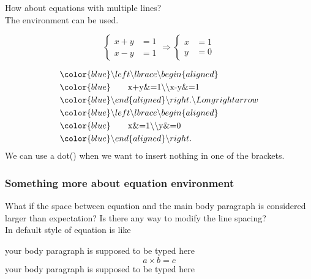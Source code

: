 \documentclass{beamer}
\begin{document}
\begin{frame}
	How about equations with multiple lines?\\
	The  environment can be used.
	\begin{example}
		\begin{equation}
		\left\lbrace\begin{aligned}
			x+y&=1\\x-y&=1
		\end{aligned}\right.\Longrightarrow
		\left\lbrace\begin{aligned}
			x&=1\\y&=0
		\end{aligned}\right.
		\end{equation}
	\end{example}
	\begin{align*}
		&\color{blue} \backslash left \backslash lbrace \backslash begin\{aligned\}\\
		&\color{blue} \quad\quad\text{x+y\&=1} \backslash \backslash \text{x-y\&=1}\\
		&\color{blue} \backslash end\{aligned\}\backslash right.\backslash Longrightarrow\\
		&\color{blue} \backslash left \backslash lbrace \backslash begin\{aligned\}\\
		&\color{blue} \quad\quad\text{x\&=1} \backslash \backslash \text{y\&=0}\\
		&\color{blue} \backslash end\{aligned\}\backslash right.
	\end{align*}
	We can use a dot() when we want to insert nothing in one of the brackets.
\end{frame}

\begin{frame}
	\frametitle{Something more about equation environment}
    What if the space between equation and the main body paragraph is considered larger than expectation? Is there any way to modify the line spacing?
\\In default style of equation is like
    \begin{example}
    your body paragraph is supposed to be typed here
        \begin{equation}
         a \times b =c
        \end{equation}
    your body paragraph is supposed to be typed here
	\end{example}
\end{frame}
\end{document}
